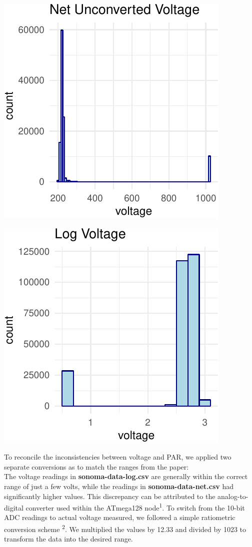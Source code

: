 \documentclass[]{article}
\begin{document}
\begin{center}\includegraphics{Project1WriteUp_files/figure-latex/unnamed-chunk-4-1} \end{center}

\begin{center}\includegraphics{Project1WriteUp_files/figure-latex/unnamed-chunk-4-2} \end{center}

To reconcile the inconsistencies between voltage and PAR, we applied two
separate conversions as to match the ranges from the paper:\\
The voltage readings in \textbf{sonoma-data-log.csv} are generally
within the correct range of just a few volts, while the readings in
\textbf{sonoma-data-net.csv} had significantly higher values. This
discrepancy can be attributed to the analog-to-digital converter used
within the ATmega128 node\textsuperscript{1}. To switch from the 10-bit
ADC readings to actual voltage measured, we followed a simple
ratiometric conversion scheme \textsuperscript{2}. We multiplied the
values by 12.33 and divided by 1023 to transform the data into the
desired range.
\end{document}
